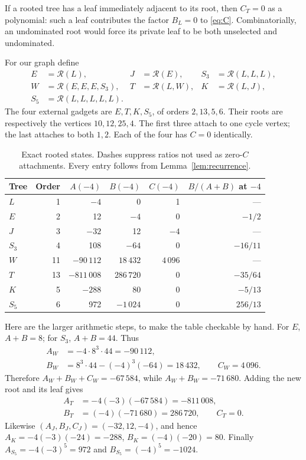 \documentclass[11pt]{article}
\numberwithin{equation}{section}
\theoremstyle{definition}
\newcommand{\Rtree}{\mathcal{R}}
\begin{document}
If a rooted tree has a leaf immediately adjacent to its root, then
\(C_T=0\) as a polynomial: such a leaf contributes the factor \(B_L=0\)
to \eqref{eq:C}. Combinatorially, an undominated root would force its
private leaf to be both unselected and undominated.

For our graph define
\begin{align*}
 E&=\Rtree(L), &J&=\Rtree(E), &S_3&=\Rtree(L,L,L),\\
 W&=\Rtree(E,E,E,S_3), &T&=\Rtree(L,W), &K&=\Rtree(L,J),\\
 S_5&=\Rtree(L,L,L,L,L).&&&&
\end{align*}
The four external gadgets are \(E,T,K,S_5\), of orders \(2,13,5,6\).
Their roots are respectively the vertices \(10,12,25,4\). The first
three attach to one cycle vertex; the last attaches to both \(1,2\).
Each of the four has \(C=0\) identically.

\begin{table}[htbp]
\centering
\small
\begin{tabular}{lrrrrr}
\toprule
Tree & Order & \(A(-4)\) & \(B(-4)\) & \(C(-4)\) & \(B/(A+B)\) at \(-4\)\\
\midrule
\(L\)   &1&\(-4\)&0&1& ---\\
\(E\)   &2&12&\(-4\)&0&\(-1/2\)\\
\(J\)   &3&\(-32\)&12&\(-4\)& ---\\
\(S_3\) &4&108&\(-64\)&0&\(-16/11\)\\
\(W\)   &11&\(-90\,112\)&\(18\,432\)&\(4\,096\)& ---\\
\(T\)   &13&\(-811\,008\)&\(286\,720\)&0&\(-35/64\)\\
\(K\)   &5&\(-288\)&80&0&\(-5/13\)\\
\(S_5\) &6&972&\(-1\,024\)&0&\(256/13\)\\
\bottomrule
\end{tabular}
\caption{Exact rooted states. Dashes suppress ratios not used as
zero-\(C\) attachments. Every entry follows from
Lemma~\ref{lem:recurrence}.}
\label{tab:states}
\end{table}

Here are the larger arithmetic steps, to make the table checkable by
hand. For \(E\), \(A+B=8\); for \(S_3\), \(A+B=44\). Thus
\begin{align*}
 A_W&=-4\cdot8^3\cdot44=-90\,112,\\
 B_W&=8^3\cdot44-(-4)^3(-64)=18\,432,\qquad C_W=4\,096.
\end{align*}
Therefore \(A_W+B_W+C_W=-67\,584\), while
\(A_W+B_W=-71\,680\). Adding the new root and its leaf gives
\begin{align*}
 A_T&=-4(-3)(-67\,584)=-811\,008,\\
 B_T&=(-4)(-71\,680)=286\,720,\qquad C_T=0.
\end{align*}
Likewise \((A_J,B_J,C_J)=(-32,12,-4)\), and hence
\(A_K=-4(-3)(-24)=-288\), \(B_K=(-4)(-20)=80\).
Finally \(A_{S_5}=-4(-3)^5=972\) and \(B_{S_5}=(-4)^5=-1024\).
\end{document}
